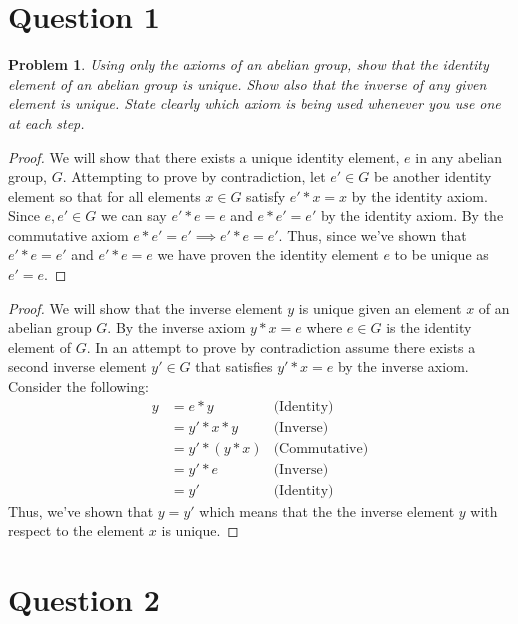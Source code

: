 \documentclass[12pt, letterpaper]{article}
\theoremstyle{plain}
\newtheorem{prob}[theorem]{Problem}
\theoremstyle{definition}
\theoremstyle{remark}
\begin{document}
\section{Question 1} %

\begin{prob} %
Using only the axioms of an abelian group, show that the identity element of an abelian group is unique. Show also that the inverse of any given element is unique. State clearly which axiom is being used whenever you use one at each step.
\end{prob}

\begin{proof}
We will show that there exists a unique identity element, $e$ in any abelian group, $G$. Attempting to prove by contradiction, let $e'\in G$ be another identity element so that for all elements $x\in G$ satisfy $e'*x=x$ by the identity axiom. Since $e,e'\in G$ we can say $e'*e=e$ and $e*e'=e'$ by the identity axiom. By the commutative axiom $e*e'=e'\implies e'*e=e'$. Thus, since we've shown that $e'*e=e'$ and $e'*e=e$ we have proven the identity element $e$ to be unique as $e'=e$.
\end{proof}

\begin{proof}
We will show that the inverse element $y$ is unique given an element $x$ of an abelian group $G$. By the inverse axiom $y*x=e$ where $e\in G$ is the identity element of $G$. In an attempt to prove by contradiction assume there exists a second inverse element $y'\in G$ that satisfies $y'*x=e$ by the inverse axiom. Consider the following:
\begin{align*}
	y &= e*y 	&\text{(Identity)} \\
	  &= y'*x*y 	&\text{(Inverse)} \\
	  &= y'*(y*x)	&\text{(Commutative)} \\
	  &= y'*e	&\text{(Inverse)} \\
	  &= y'		&\text{(Identity)}
\end{align*}
Thus, we've shown that $y=y'$ which means that the the inverse element $y$ with respect to the element $x$ is unique.

\end{proof}


\section{Question 2} %
\end{document}

